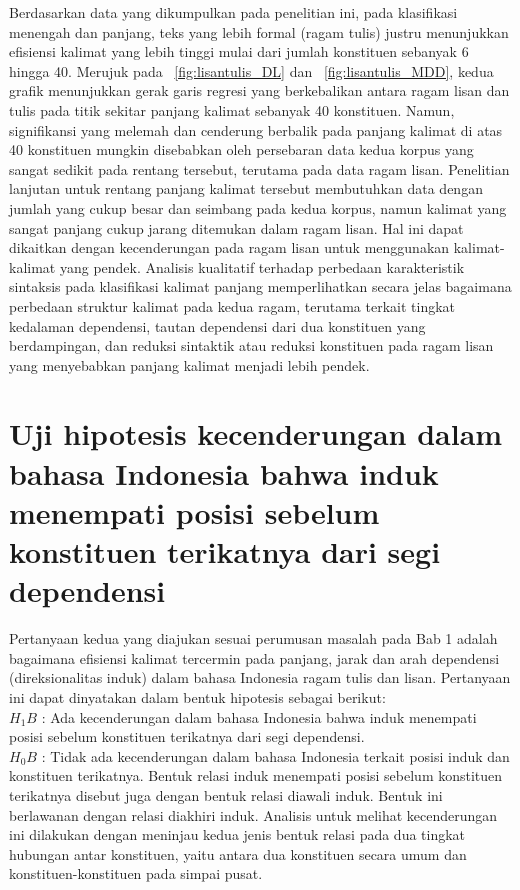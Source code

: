 Berdasarkan data yang dikumpulkan pada penelitian ini, pada klasifikasi menengah dan panjang, teks yang lebih formal (ragam tulis) justru menunjukkan efisiensi kalimat yang lebih tinggi mulai dari jumlah konstituen sebanyak 6 hingga 40. Merujuk pada \pic~\ref{fig:lisantulis_DL} dan \pic~\ref{fig:lisantulis_MDD}, kedua grafik menunjukkan gerak garis regresi yang berkebalikan antara ragam lisan dan tulis pada titik sekitar panjang kalimat sebanyak 40 konstituen. Namun, signifikansi yang melemah dan cenderung berbalik pada panjang kalimat di atas 40 konstituen mungkin disebabkan oleh persebaran data kedua korpus yang sangat sedikit pada rentang tersebut, terutama pada data ragam lisan. Penelitian lanjutan untuk rentang panjang kalimat tersebut membutuhkan data dengan jumlah yang cukup besar dan seimbang pada kedua korpus, namun kalimat yang sangat panjang cukup jarang ditemukan dalam ragam lisan. Hal ini dapat dikaitkan dengan kecenderungan pada ragam lisan untuk menggunakan kalimat-kalimat yang pendek. Analisis kualitatif terhadap perbedaan karakteristik sintaksis pada klasifikasi kalimat panjang memperlihatkan secara jelas bagaimana perbedaan struktur kalimat pada kedua ragam, terutama terkait tingkat kedalaman dependensi, tautan dependensi dari dua konstituen yang berdampingan, dan reduksi sintaktik atau reduksi konstituen pada ragam lisan yang menyebabkan panjang kalimat menjadi lebih pendek.

\section{Uji hipotesis kecenderungan dalam bahasa Indonesia bahwa induk menempati posisi sebelum konstituen terikatnya dari segi dependensi}
Pertanyaan kedua yang diajukan sesuai perumusan masalah pada Bab 1 adalah bagaimana efisiensi kalimat tercermin pada panjang, jarak dan arah dependensi (direksionalitas induk) dalam bahasa Indonesia ragam tulis dan lisan. Pertanyaan ini dapat dinyatakan dalam bentuk hipotesis sebagai berikut: \\
$H_{1}B$ : Ada kecenderungan dalam bahasa Indonesia bahwa induk menempati posisi sebelum konstituen terikatnya dari segi dependensi. \\
$H_{0}B$ : Tidak ada kecenderungan dalam bahasa Indonesia terkait posisi induk dan konstituen terikatnya.
Bentuk relasi induk menempati posisi sebelum konstituen terikatnya disebut juga dengan bentuk relasi diawali induk. Bentuk ini berlawanan dengan relasi diakhiri induk. Analisis untuk melihat kecenderungan ini dilakukan dengan meninjau kedua jenis bentuk relasi pada dua tingkat hubungan antar konstituen, yaitu antara dua konstituen secara umum dan konstituen-konstituen pada simpai pusat. 


